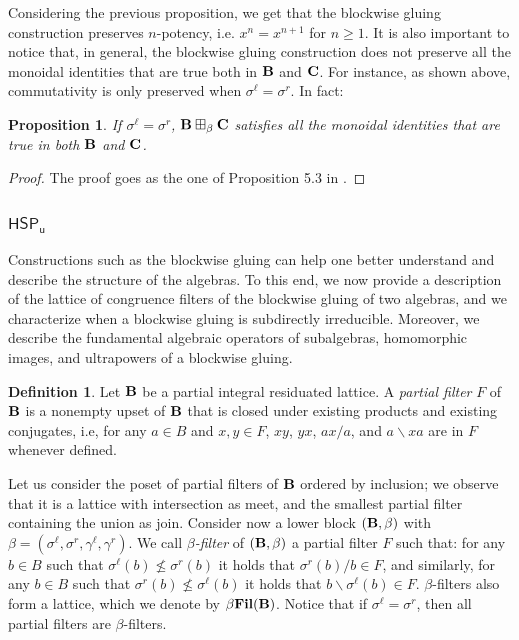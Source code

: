 \documentclass{amsart}
\newtheorem{proposition}[theorem]{Proposition}
\theoremstyle{definition}
\newtheorem{definition}[theorem]{Definition}
\numberwithin{equation}{section}
\newcommand{\alg}[1]{{\textbf{\upshape #1}}}  %
\newcommand{\vv}[1]{\mathsf {#1}}
\newcommand{\sell}{\sigma^\ell}
\newcommand{\sr}{\sigma^r}
\newcommand{\gell}{\gamma^\ell}
\newcommand{\gr}{\gamma^r}
\newcommand{\betafil}{\mathbf{\beta Fil}}
\begin{document}
Considering the previous proposition, we get that the blockwise gluing construction preserves $n$-potency, i.e. $x^n=x^{n+1}$ for $n \geq 1$. It is also important to notice that, in general, the blockwise gluing construction does not preserve all the monoidal identities that are true both in $\alg B$ and $\alg C$. For instance, as shown above, commutativity is only preserved when $\sell=\sr$. In fact: 
 \begin{proposition}
	If  $\sell=\sr$, $\alg B \boxplus_\beta \alg C$ satisfies all the monoidal identities that are true in both $\alg B$ and $\alg C$. 
\end{proposition}
\begin{proof}
	The proof goes as the one of Proposition 5.3 in \cite{GalatosUgolini}.
\end{proof}

\subsubsection{$\vv{HSP_u}$} Constructions such as the blockwise gluing can help one better understand and describe the structure of the algebras. To this end, we now provide a description of the lattice of congruence filters of the blockwise gluing of two algebras, and we characterize when a blockwise gluing is subdirectly irreducible. Moreover, we describe the fundamental algebraic operators of subalgebras, homomorphic images, and ultrapowers of a blockwise gluing.  
 
\begin{definition}
	Let $\alg B$ be a partial integral residuated lattice. A {\em partial filter} $F$ of $\alg B$ is a nonempty upset of $\alg B$ that is closed under existing products and existing conjugates, i.e, for any $a \in B$ and $x, y \in F$, $xy$, $yx$, $ax/a$, and $a\backslash xa$ are in $F$ whenever defined.
\end{definition}

Let us consider the poset of partial filters of $\alg B$ ordered by inclusion; we observe that it is a lattice with intersection as meet, and the smallest partial filter containing the union as join. 
Consider now a lower block $(\alg B, \beta)$ with $\beta = (\sell, \sr, \gell, \gr)$. We call {\em $\beta$-filter} of $(\alg B, \beta)$ a partial filter $F$ such that: for any $b \in B$ such that $\sell(b) \not\leq\sr(b)$ it holds that $\sr(b) /b \in F$, and similarly, for any $b \in B$ such that $\sr(b) \not\leq \sell(b)$ it holds that $b \backslash \sell(b) \in F$. $\beta$-filters also form a lattice, which we denote by $\betafil(\alg B)$. Notice that if $\sell=\sr$, then all partial filters are $\beta$-filters.
\end{document}
